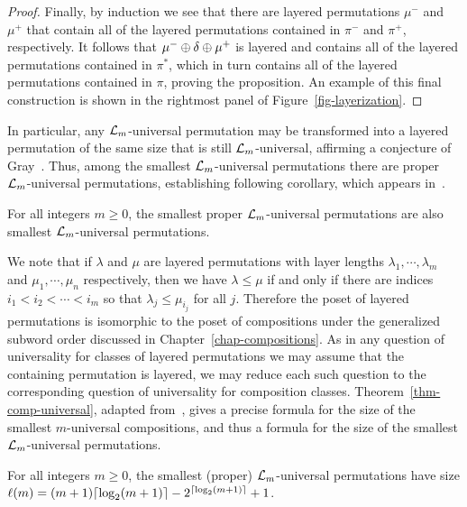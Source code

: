 \begin{proof}
	Finally, by induction we see that there are layered permutations $\mu^-$ and $\mu^+$ that contain all of the layered permutations contained in $\pi^-$ and $\pi^+$, respectively. It follows that $\mu^- \oplus \delta \oplus \mu^+$ is layered and contains all of the layered permutations contained in $\pi^\ast$, which in turn contains all of the layered permutations contained in $\pi$, proving the proposition. An example of this final construction is shown in the rightmost panel of Figure~\ref{fig-layerization}.
\end{proof}

In particular, any $\mathcal{L}_m$-universal permutation may be transformed into a layered permutation of the same size that is still $\mathcal{L}_m$-universal, affirming a conjecture of Gray~\cite{gray:bounds-on-super:}. Thus, among the smallest $\mathcal{L}_m$-universal permutations there are proper $\mathcal{L}_m$-universal permutations, establishing following corollary, which appears in~\cite{albert:universal-layer:}.
\begin{corollary}
	For all integers $m \ge 0$, the smallest proper $\mathcal{L}_m$-universal permutations are also smallest $\mathcal{L}_m$-universal permutations.
\end{corollary}

We note that if $\lambda$ and $\mu$ are layered permutations with layer lengths $\lambda_1, \cdots, \lambda_m$ and $\mu_1, \cdots, \mu_n$ respectively, then we have $\lambda \le \mu$ if and only if there are indices $i_1 < i_2 < \cdots < i_m$ so that $\lambda_{j} \le \mu_{i_j}$ for all $j$. Therefore the poset of layered permutations is isomorphic to the poset of compositions under the generalized subword order discussed in Chapter~\ref{chap-compositions}. As in any question of universality for classes of layered permutations we may assume that the containing permutation is layered, we may reduce each such question to the corresponding question of universality for composition classes. Theorem~\ref{thm-comp-universal}, adapted from~\cite{albert:universal-layer:}, gives a precise formula for the size of the smallest $m$-universal compositions, and thus a formula for the size of the smallest $\mathcal{L}_m$-universal permutations.
\begin{corollary}
\label{cor-perm-layered}
	For all integers $m \ge 0$, the smallest (proper) $\mathcal{L}_m$-universal permutations have size $\ell(m) = (m+1){\left\lceil{\log_2 (m+1)}\right\rceil} - 2^{{\left\lceil{\log_2 (m+1)}\right\rceil}} + 1$.
\end{corollary}

